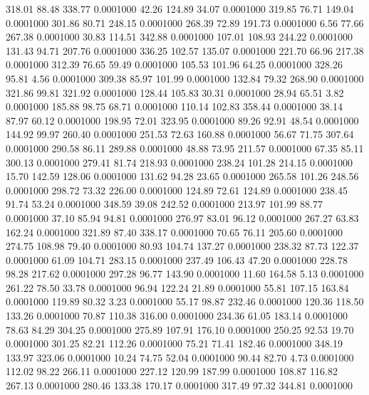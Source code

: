  318.01   88.48  338.77   0.0001000
  42.26  124.89   34.07   0.0001000
 319.85   76.71  149.04   0.0001000
 301.86   80.71  248.15   0.0001000
 268.39   72.89  191.73   0.0001000
   6.56   77.66  267.38   0.0001000
  30.83  114.51  342.88   0.0001000
 107.01  108.93  244.22   0.0001000
 131.43   94.71  207.76   0.0001000
 336.25  102.57  135.07   0.0001000
 221.70   66.96  217.38   0.0001000
 312.39   76.65   59.49   0.0001000
 105.53  101.96   64.25   0.0001000
 328.26   95.81    4.56   0.0001000
 309.38   85.97  101.99   0.0001000
 132.84   79.32  268.90   0.0001000
 321.86   99.81  321.92   0.0001000
 128.44  105.83   30.31   0.0001000
  28.94   65.51    3.82   0.0001000
 185.88   98.75   68.71   0.0001000
 110.14  102.83  358.44   0.0001000
  38.14   87.97   60.12   0.0001000
 198.95   72.01  323.95   0.0001000
  89.26   92.91   48.54   0.0001000
 144.92   99.97  260.40   0.0001000
 251.53   72.63  160.88   0.0001000
  56.67   71.75  307.64   0.0001000
 290.58   86.11  289.88   0.0001000
  48.88   73.95  211.57   0.0001000
  67.35   85.11  300.13   0.0001000
 279.41   81.74  218.93   0.0001000
 238.24  101.28  214.15   0.0001000
  15.70  142.59  128.06   0.0001000
 131.62   94.28   23.65   0.0001000
 265.58  101.26  248.56   0.0001000
 298.72   73.32  226.00   0.0001000
 124.89   72.61  124.89   0.0001000
 238.45   91.74   53.24   0.0001000
 348.59   39.08  242.52   0.0001000
 213.97  101.99   88.77   0.0001000
  37.10   85.94   94.81   0.0001000
 276.97   83.01   96.12   0.0001000
 267.27   63.83  162.24   0.0001000
 321.89   87.40  338.17   0.0001000
  70.65   76.11  205.60   0.0001000
 274.75  108.98   79.40   0.0001000
  80.93  104.74  137.27   0.0001000
 238.32   87.73  122.37   0.0001000
  61.09  104.71  283.15   0.0001000
 237.49  106.43   47.20   0.0001000
 228.78   98.28  217.62   0.0001000
 297.28   96.77  143.90   0.0001000
  11.60  164.58    5.13   0.0001000
 261.22   78.50   33.78   0.0001000
  96.94  122.24   21.89   0.0001000
  55.81  107.15  163.84   0.0001000
 119.89   80.32    3.23   0.0001000
  55.17   98.87  232.46   0.0001000
 120.36  118.50  133.26   0.0001000
  70.87  110.38  316.00   0.0001000
 234.36   61.05  183.14   0.0001000
  78.63   84.29  304.25   0.0001000
 275.89  107.91  176.10   0.0001000
 250.25   92.53   19.70   0.0001000
 301.25   82.21  112.26   0.0001000
  75.21   71.41  182.46   0.0001000
 348.19  133.97  323.06   0.0001000
  10.24   74.75   52.04   0.0001000
  90.44   82.70    4.73   0.0001000
 112.02   98.22  266.11   0.0001000
 227.12  120.99  187.99   0.0001000
 108.87  116.82  267.13   0.0001000
 280.46  133.38  170.17   0.0001000
 317.49   97.32  344.81   0.0001000
